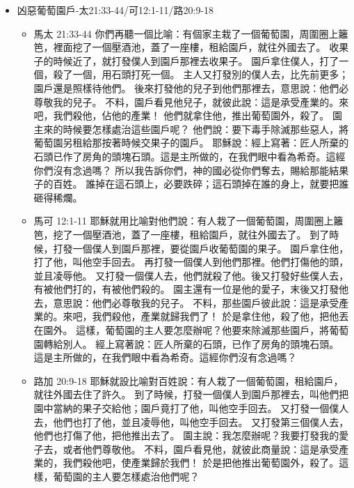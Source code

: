 \begin{itemize}
又說：一個人有兩個兒子。他來對大兒子說：我兒，你今天到葡萄園裡去做工。
他回答說：我不去，以後自己懊悔，就去了。
又來對小兒子也是這樣說。他回答說：父啊，我去，他卻不去。
你們想，這兩個兒子是哪一個遵行父命呢？他們說：大兒子。耶穌說：我實在告訴你們，稅吏和娼妓倒比你們先進神的國。
因為約翰遵著義路到你們這裡來，你們卻不信他；稅吏和娼妓倒信他。你們看見了，後來還是不懊悔去信他。
\item{凶惡葡萄園戶-太21:33-44/可12:1-11/路20:9-18}
\begin{itemize}
\item{馬太 21:33-44}
你們再聽一個比喻：有個家主栽了一個葡萄園，周圍圈上籬笆，裡面挖了一個壓酒池，蓋了一座樓，租給園戶，就往外國去了。
收果子的時候近了，就打發僕人到園戶那裡去收果子。
園戶拿住僕人，打了一個，殺了一個，用石頭打死一個。
主人又打發別的僕人去，比先前更多；園戶還是照樣待他們。
後來打發他的兒子到他們那裡去，意思說：他們必尊敬我的兒子。
不料，園戶看見他兒子，就彼此說：這是承受產業的。來吧，我們殺他，佔他的產業！
他們就拿住他，推出葡萄園外，殺了。
園主來的時候要怎樣處治這些園戶呢？
他們說：要下毒手除滅那些惡人，將葡萄園另租給那按著時候交果子的園戶。
耶穌說：經上寫著：匠人所棄的石頭已作了房角的頭塊石頭。這是主所做的，在我們眼中看為希奇。這經你們沒有念過嗎？
所以我告訴你們，神的國必從你們奪去，賜給那能結果子的百姓。
誰掉在這石頭上，必要跌碎；這石頭掉在誰的身上，就要把誰砸得稀爛。
\item{馬可 12:1-11}
耶穌就用比喻對他們說：有人栽了一個葡萄園，周圍圈上籬笆，挖了一個壓酒池，蓋了一座樓，租給園戶，就往外國去了。
到了時候，打發一個僕人到園戶那裡，要從園戶收葡萄園的果子。
園戶拿住他，打了他，叫他空手回去。
再打發一個僕人到他們那裡。他們打傷他的頭，並且凌辱他。
又打發一個僕人去，他們就殺了他。後又打發好些僕人去，有被他們打的，有被他們殺的。
園主還有一位是他的愛子，末後又打發他去，意思說：他們必尊敬我的兒子。
不料，那些園戶彼此說：這是承受產業的。來吧，我們殺他，產業就歸我們了！
於是拿住他，殺了他，把他丟在園外。
這樣，葡萄園的主人要怎麼辦呢？他要來除滅那些園戶，將葡萄園轉給別人。
經上寫著說：匠人所棄的石頭，已作了房角的頭塊石頭。
這是主所做的，在我們眼中看為希奇。這經你們沒有念過嗎？
\item{路加 20:9-18}
耶穌就設比喻對百姓說：有人栽了一個葡萄園，租給園戶，就往外國去住了許久。
到了時候，打發一個僕人到園戶那裡去，叫他們把園中當納的果子交給他；園戶竟打了他，叫他空手回去。
又打發一個僕人去，他們也打了他，並且凌辱他，叫他空手回去。
又打發第三個僕人去，他們也打傷了他，把他推出去了。
園主說：我怎麼辦呢？我要打發我的愛子去，或者他們尊敬他。
不料，園戶看見他，就彼此商量說：這是承受產業的，我們殺他吧，使產業歸於我們！
於是把他推出葡萄園外，殺了。這樣，葡萄園的主人要怎樣處治他們呢？

\end{itemize}
\end{itemize}

